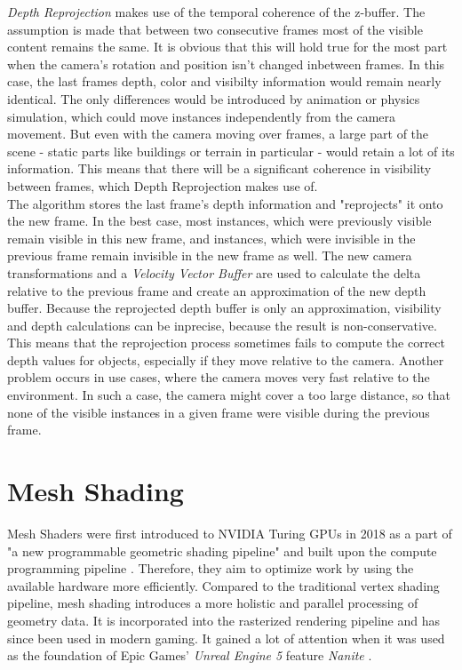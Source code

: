 \emph{Depth Reprojection} makes use of the temporal coherence of the z-buffer. The assumption is made that 
between two consecutive frames most of the visible content remains the same. It is obvious that this will 
hold true for the most part when the camera's rotation and position isn't changed inbetween frames. In this case, 
the last frames depth, color and visibilty information would remain nearly identical. The only differences would 
be introduced by animation or physics simulation, which could move instances independently from the camera movement.
But even with the camera moving over frames, a large part of the scene - static parts like buildings or terrain in 
particular - would retain a lot of its information. This means that there will be a significant coherence in 
visibility between frames, which Depth Reprojection makes use of.\\

\noindent
The algorithm stores the last frame's depth information and "reprojects" it onto the new frame. In the best case, 
most instances, which were previously visible remain visible in this new frame, and instances, which were invisible 
in the previous frame remain invisible in the new frame as well. The new camera transformations and a 
\emph{Velocity Vector Buffer} are used to calculate the delta relative to the previous frame and create an 
approximation of the new depth buffer. Because the reprojected depth buffer is only an approximation, visibility 
and depth calculations can be inprecise, because the result is non-conservative. This means that the reprojection 
process sometimes fails to compute the correct depth values for objects, especially if they move relative to the 
camera. Another problem occurs in use cases, where the camera moves very fast relative to the environment. In such 
a case, the camera might cover a too large distance, so that none of the visible instances in a given frame were 
visible during the previous frame. \cite{Kruskonja2022} \\


\section{Mesh Shading}  \label{sec-mesh-shading}

Mesh Shaders were first introduced to NVIDIA Turing \ac{GPU}s in 2018 as a part of "a new programmable 
geometric shading pipeline" and built upon the compute programming pipeline \cite{Kubisch2018}. 
Therefore, they aim to optimize work by using the available hardware more efficiently. Compared to the 
traditional vertex shading pipeline, mesh shading introduces a more holistic and parallel processing of 
geometry data. It is incorporated into the rasterized rendering pipeline and has since been used in modern 
gaming. It gained a lot of attention when it was used as the foundation of Epic Games' \emph{Unreal Engine 5} 
feature \emph{Nanite} \cite{Karis2021}.\\


